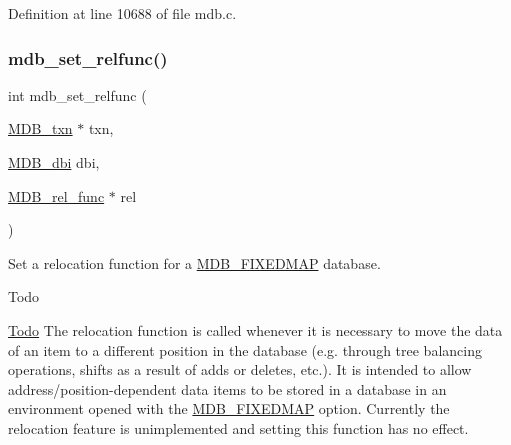 Definition at line 10688 of file mdb.\+c.

\mbox{\label{group__mdb_ga697d82c7afe79f142207ad5adcdebfeb}} 
\subsubsection{\texorpdfstring{mdb\+\_\+set\+\_\+relfunc()}{mdb\_set\_relfunc()}}
{\footnotesize\ttfamily int mdb\+\_\+set\+\_\+relfunc (\begin{DoxyParamCaption}\item[{\mbox{\hyperlink{struct_m_d_b__txn}{M\+D\+B\+\_\+txn}} $\ast$}]{txn,  }\item[{\mbox{\hyperlink{group__mdb_gadbe68a06c448dfb62da16443d251a78b}{M\+D\+B\+\_\+dbi}}}]{dbi,  }\item[{\mbox{\hyperlink{group__mdb_ga311e8b7d73c5e7c03b625a894c5014cb}{M\+D\+B\+\_\+rel\+\_\+func}} $\ast$}]{rel }\end{DoxyParamCaption})}



Set a relocation function for a \mbox{\hyperlink{group__mdb__env_ga492952277c481bc4a6fa08ef71c29487}{M\+D\+B\+\_\+\+F\+I\+X\+E\+D\+M\+AP}} database. 

\begin{DoxyRefDesc}{Todo}
\item[\mbox{\hyperlink{todo__todo000002}{Todo}}]The relocation function is called whenever it is necessary to move the data of an item to a different position in the database (e.\+g. through tree balancing operations, shifts as a result of adds or deletes, etc.). It is intended to allow address/position-\/dependent data items to be stored in a database in an environment opened with the \mbox{\hyperlink{group__mdb__env_ga492952277c481bc4a6fa08ef71c29487}{M\+D\+B\+\_\+\+F\+I\+X\+E\+D\+M\+AP}} option. Currently the relocation feature is unimplemented and setting this function has no effect. \end{DoxyRefDesc}

